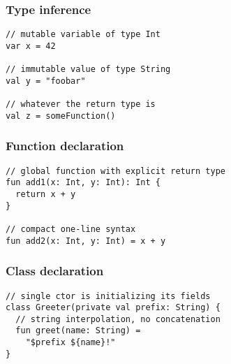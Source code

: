 


\begin{frame}[fragile] \frametitle{Type inference}
\begin{lstlisting}
// mutable variable of type Int
var x = 42

// immutable value of type String
val y = "foobar"

// whatever the return type is
val z = someFunction()
\end{lstlisting}
\end{frame}


\begin{frame}[fragile] \frametitle{Function declaration}
\begin{lstlisting}
// global function with explicit return type
fun add1(x: Int, y: Int): Int {
  return x + y
}

// compact one-line syntax
fun add2(x: Int, y: Int) = x + y
\end{lstlisting}
\end{frame}


\begin{frame}[fragile] \frametitle{Class declaration}
\begin{lstlisting}
// single ctor is initializing its fields
class Greeter(private val prefix: String) {
  // string interpolation, no concatenation
  fun greet(name: String) =
    "$prefix ${name}!"
}
\end{lstlisting}
\end{frame}

